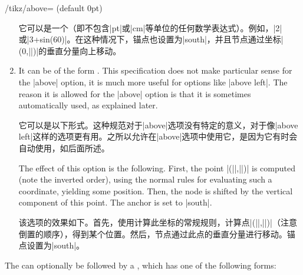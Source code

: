 \begin{key}{/tikz/above= (default 0pt)}
\begin{enumerate}
            它可以是一个（即不包含|pt|或|cm|等单位的任何数学表达式）。例如，|2|或|3+sin(60)|。在这种情况下，锚点也设置为|south|，并且节点通过坐标|(0,||)|的垂直分量向上移动。
\begin{codeexample}[]
\end{codeexample}
        \item It can be of the form
            .
            This specification does not make particular sense for the |above|
            option, it is much more useful for options like |above left|. The
            reason it is allowed for the |above| option is that it is sometimes
            automatically used, as explained later.

            它可以是以下形式。这种规范对于|above|选项没有特定的意义，对于像|above left|这样的选项更有用。之所以允许在|above|选项中使用它，是因为它有时会自动使用，如后面所述。

            The effect of this option is the following. First, the point
            |(||,||)|
            is computed (note the inverted order), using the normal rules for
            evaluating such a coordinate, yielding some position. Then, the
            node is shifted by the vertical component of this point. The anchor
            is set to |south|.
            
            该选项的效果如下。首先，使用计算此坐标的常规规则，计算点|(||,||)|（注意倒置的顺序），得到某个位置。然后，节点通过此点的垂直分量进行移动。锚点设置为|south|。
\begin{codeexample}[preamble={\usetikzlibrary{positioning}}]
\end{codeexample}
    \end{enumerate}
    The  can optionally be followed by a ,
    which has one of the following forms:
    

\end{key}
